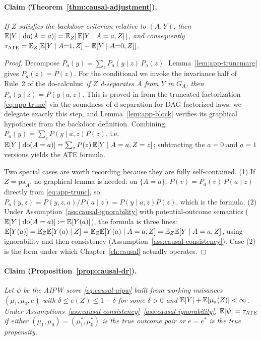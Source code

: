\paragraph{Claim (Theorem~\ref{thm:causal-adjustment}).}
\emph{If $Z$ satisfies the backdoor criterion relative to $(A, Y)$, then $\mathbb{E}[Y \mid \mathrm{do}(A=a)] =
\mathbb{E}_Z[\, \mathbb{E}[Y \mid A=a, Z] \,]$, and consequently $\tau_{\mathrm{ATE}} = \mathbb{E}_Z[\mathbb{E}[Y \mid A{=}1, Z] -
\mathbb{E}[Y \mid A{=}0, Z]]$.}

\begin{proof}
Decompose $P_a(y) = \sum_z P_a(y \mid z)\, P_a(z)$. Lemma~\ref{lem:app-truncmarg} gives $P_a(z) =
P(z)$. For the conditional we invoke the invariance half of Rule~2 of the do-calculus: \emph{if $Z$
d-separates $A$ from $Y$ in $G_{\underline{A}}$, then $P_a(y \mid z) = P(y \mid a, z)$}. This is
proved in \cite{pearl1995} from the truncated factorization \eqref{eq:app-trunc} via the soundness
of d-separation for DAG-factorized laws; we delegate exactly this step, and
Lemma~\ref{lem:app-block} verifies its graphical hypothesis from the backdoor definition. Combining,
$P_a(y) = \sum_z P(y \mid a, z) P(z)$, i.e.\ $\mathbb{E}[Y \mid \mathrm{do}(A=a)] = \sum_z P(z)\, \mathbb{E}[Y \mid A=a,
Z=z]$; subtracting the $a = 0$ and $a = 1$ versions yields the ATE formula.

Two special cases are worth recording because they are fully self-contained. (1) If $Z =
\mathrm{pa}_A$, no graphical lemma is needed: on $\{A = a\}$, $P(v) = P_a(v)\, P(a \mid z)$ directly
from \eqref{eq:app-trunc}, so $P_a(y, z) = P(y, z, a)/P(a \mid z) = P(y \mid a, z) P(z)$, which is
the formula. (2) Under Assumption~\ref{ass:causal-ignorability} with potential-outcome semantics
($\mathbb{E}[Y \mid \mathrm{do}(A=a)] := \mathbb{E}[Y(a)]$), the formula is three lines: $\mathbb{E}[Y(a)] = \mathbb{E}_Z\mathbb{E}[Y(a) \mid Z] =
\mathbb{E}_Z\mathbb{E}[Y(a) \mid A=a, Z] = \mathbb{E}_Z\mathbb{E}[Y \mid A=a, Z]$, using ignorability and then consistency
(Assumption~\ref{ass:causal-consistency}). Case (2) is the form under which Chapter~\ref{ch:causal}
actually operates.
\end{proof}

\paragraph{Claim (Proposition~\ref{prop:causal-dr}).}
\emph{Let $\psi$ be the AIPW score \eqref{eq:causal-aipw} built from working nuisances $(\mu_1,
\mu_0, e)$ with $\delta \le e(Z) \le 1 - \delta$ for some $\delta > 0$ and $\mathbb{E}|Y| + \mathbb{E}|\mu_a(Z)| <
\infty$. Under Assumptions~\ref{ass:causal-consistency}--\ref{ass:causal-ignorability}, $\mathbb{E}[\psi] =
\tau_{\mathrm{ATE}}$ if either $(\mu_1, \mu_0) = (\mu_1^*, \mu_0^*)$ is the true outcome pair or $e
= e^*$ is the true propensity.}

